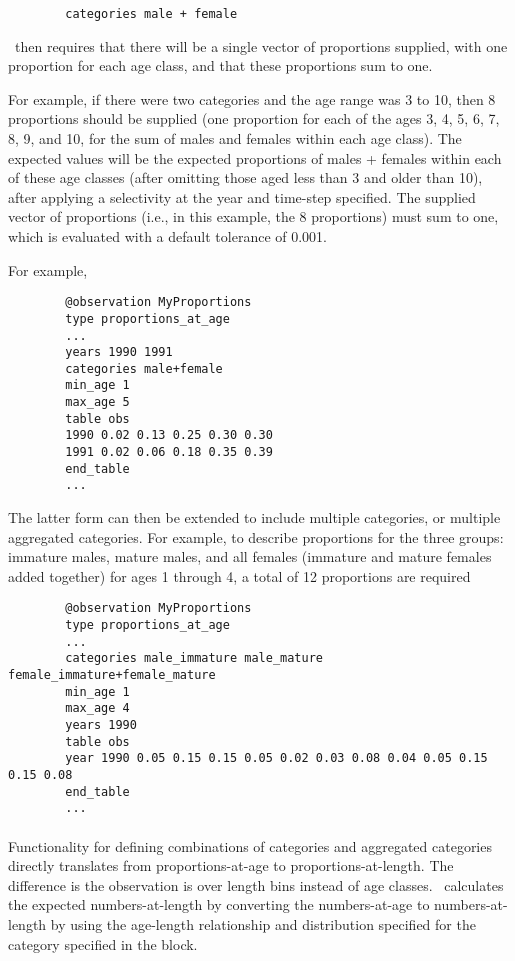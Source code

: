 {\small{\begin{verbatim}
		categories male + female
		\end{verbatim}}}

\CNAME\ then requires that there will be a single vector of proportions supplied, with one proportion for each age class, and that these proportions sum to one.

For example, if there were two categories and the age range was 3 to 10, then 8 proportions should be supplied (one proportion for each of the ages 3, 4, 5, 6, 7, 8, 9, and 10, for the sum of males and females within each age class). The expected values will be the expected proportions of males + females within each of these age classes (after omitting those aged less than 3 and older than 10), after applying a selectivity at the year and time-step specified. The supplied vector of proportions (i.e., in this example, the 8 proportions) must sum to one, which is evaluated with a default tolerance of 0.001.

For example,

{\small{\begin{verbatim}
		@observation MyProportions
		type proportions_at_age
		...
		years 1990 1991
		categories male+female
		min_age 1
		max_age 5
		table obs
		1990 0.02 0.13 0.25 0.30 0.30
		1991 0.02 0.06 0.18 0.35 0.39
		end_table
		...
		\end{verbatim}}}

The latter form can then be extended to include multiple categories, or multiple aggregated categories. For example, to describe proportions for the three groups: immature males, mature males, and all females (immature and mature females added together) for ages 1 through 4, a total of 12 proportions are required

{\small{\begin{verbatim}
		@observation MyProportions
		type proportions_at_age
		...
		categories male_immature male_mature female_immature+female_mature
		min_age 1
		max_age 4
		years 1990
		table obs
		year 1990 0.05 0.15 0.15 0.05 0.02 0.03 0.08 0.04 0.05 0.15 0.15 0.08
		end_table
		...
		\end{verbatim}}}

\paragraph*{}\label{sec:Observation-ProportionsAtLength}

Functionality for defining combinations of categories and aggregated categories directly translates from proportions-at-age to proportions-at-length. The difference is the observation is over length bins instead of age classes. \CNAME\ calculates the expected numbers-at-length by converting the numbers-at-age to numbers-at-length by using the age-length relationship and distribution specified for the category specified in the  block.

